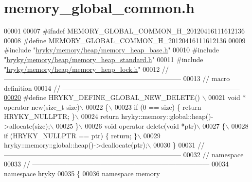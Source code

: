 \hypertarget{memory__global__common_8h_source}{\section{memory\-\_\-global\-\_\-common.\-h}
}

\begin{DoxyCode}
00001 
00007 \textcolor{preprocessor}{#ifndef MEMORY\_GLOBAL\_COMMON\_H\_20120416111612136}
00008 \textcolor{preprocessor}{}\textcolor{preprocessor}{#define MEMORY\_GLOBAL\_COMMON\_H\_20120416111612136}
00009 \textcolor{preprocessor}{}\textcolor{preprocessor}{#include "\hyperlink{memory__heap__base_8h}{hryky/memory/heap/memory_heap_base.h}"}
00010 \textcolor{preprocessor}{#include "\hyperlink{memory__heap__standard_8h}{hryky/memory/heap/memory_heap_standard.h}"}
00011 \textcolor{preprocessor}{#include "\hyperlink{memory__heap__lock_8h}{hryky/memory/heap/memory_heap_lock.h}"}
00012 \textcolor{comment}{//
      ------------------------------------------------------------------------------}
00013 \textcolor{comment}{// macro definition}
00014 \textcolor{comment}{//
      ------------------------------------------------------------------------------}
\hypertarget{memory__global__common_8h_source_l00020}{}\hyperlink{memory__global__common_8h_a64f3ccc3424c9c440b03c07f96249051}{00020} \textcolor{comment}{}\textcolor{preprocessor}{#define HRYKY\_DEFINE\_GLOBAL\_NEW\_DELETE() \(\backslash\)}
00021 \textcolor{preprocessor}{    void * operator new(size\_t size)\(\backslash\)}
00022 \textcolor{preprocessor}{    \{\(\backslash\)}
00023 \textcolor{preprocessor}{        if (0 == size) \{ return HRYKY\_NULLPTR; \}\(\backslash\)}
00024 \textcolor{preprocessor}{        return hryky::memory::global::heap()->allocate(size);\(\backslash\)}
00025 \textcolor{preprocessor}{    \}\(\backslash\)}
00026 \textcolor{preprocessor}{    void operator delete(void *ptr)\(\backslash\)}
00027 \textcolor{preprocessor}{    \{\(\backslash\)}
00028 \textcolor{preprocessor}{        if (HRYKY\_NULLPTR == ptr) \{ return; \}\(\backslash\)}
00029 \textcolor{preprocessor}{        hryky::memory::global::heap()->deallocate(ptr);\(\backslash\)}
00030 \textcolor{preprocessor}{    \}}
00031 \textcolor{preprocessor}{}\textcolor{comment}{//
      ------------------------------------------------------------------------------}
00032 \textcolor{comment}{// namespace}
00033 \textcolor{comment}{//
      ------------------------------------------------------------------------------}
00034 \textcolor{keyword}{namespace }hryky
00035 \{
00036 \textcolor{keyword}{namespace }memory

\end{DoxyCode}
